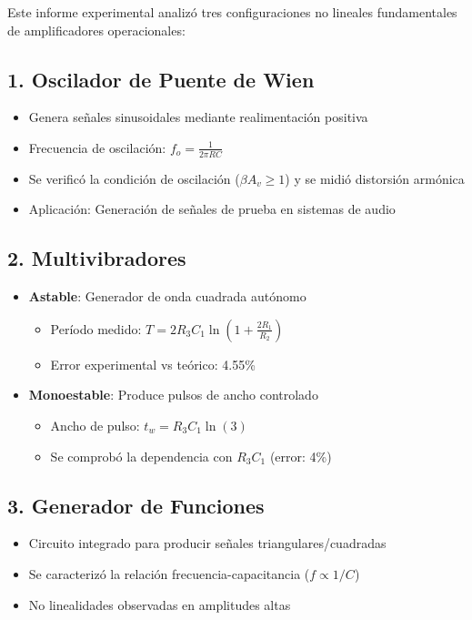 Este informe experimental analizó tres configuraciones no lineales fundamentales de amplificadores operacionales:

\subsection{1. Oscilador de Puente de Wien}
\begin{itemize}
\item Genera señales sinusoidales mediante realimentación positiva
\item Frecuencia de oscilación: $f_o = \frac{1}{2\pi RC}$
\item Se verificó la condición de oscilación ($\beta A_v \geq 1$) y se midió distorsión armónica
\item Aplicación: Generación de señales de prueba en sistemas de audio
\end{itemize}

\subsection{2. Multivibradores}
\begin{itemize}
\item \textbf{Astable}: Generador de onda cuadrada autónomo
  \begin{itemize}
  \item Período medido: $T = 2R_3C_1\ln(1+\frac{2R_1}{R_2})$
  \item Error experimental vs teórico: 4.55\%
  \end{itemize}
  
\item \textbf{Monoestable}: Produce pulsos de ancho controlado
  \begin{itemize}
  \item Ancho de pulso: $t_w = R_3C_1\ln(3)$
  \item Se comprobó la dependencia con $R_3C_1$ (error: 4\%)
  \end{itemize}
\end{itemize}

\subsection{3. Generador de Funciones}
\begin{itemize}
\item Circuito integrado para producir señales triangulares/cuadradas
\item Se caracterizó la relación frecuencia-capacitancia ($f \propto 1/C$)
\item No linealidades observadas en amplitudes altas
\end{itemize}
